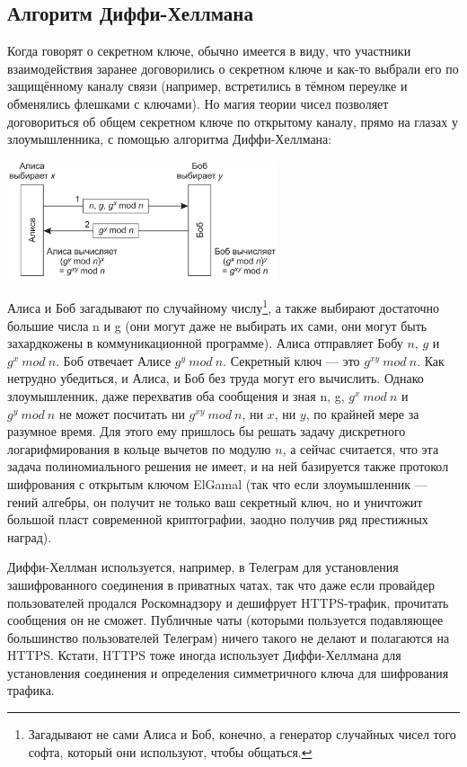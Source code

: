 \documentclass{../mcstext}
\begin{document}
\subsection{Алгоритм Диффи-Хеллмана}

Когда говорят о секретном ключе, обычно имеется в виду, что участники взаимодействия заранее договорились о секретном ключе и как-то выбрали его по защищённому каналу связи (например, встретились в тёмном переулке и обменялись флешками с ключами). Но магия теории чисел позволяет договориться об общем секретном ключе по открытому каналу, прямо на глазах у злоумышленника, с помощью алгоритма Диффи-Хеллмана:

\begin{center}
    \includegraphics[width=0.6\textwidth]{diffieHellman.png}
\end{center}

Алиса и Боб загадывают по случайному числу\footnote{Загадывают не сами Алиса и Боб, конечно, а генератор случайных чисел того софта, который они используют, чтобы общаться.}, а также выбирают достаточно большие числа n и g (они могут даже не выбирать их сами, они могут быть захардкожены в коммуникационной программе). Алиса отправляет Бобу $n$, $g$ и $g^x\ mod\ n$. Боб отвечает Алисе $g^y\ mod\ n$. Секретный ключ --- это $g^{xy}\ mod\ n$. Как нетрудно убедиться, и Алиса, и Боб без труда могут его вычислить. Однако злоумышленник, даже перехватив оба сообщения и зная n, g, $g^x\ mod\ n$ и $g^y\ mod\ n$ не может посчитать ни $g^{xy}\ mod\ n$, ни $x$, ни $y$, по крайней мере за разумное время. Для этого ему пришлось бы решать задачу дискретного логарифмирования в кольце вычетов по модулю $n$, а сейчас считается, что эта задача полиномиального решения не имеет, и на ней базируется также протокол шифрования с открытым ключом ElGamal (так что если злоумышленник --- гений алгебры, он получит не только ваш секретный ключ, но и уничтожит большой пласт современной криптографии, заодно получив ряд престижных наград).

Диффи-Хеллман используется, например, в Телеграм для установления зашифрованного соединения в приватных чатах, так что даже если провайдер пользователей продался Роскомнадзору и дешифрует HTTPS-трафик, прочитать сообщения он не сможет. Публичные чаты (которыми пользуется подавляющее большинство пользователей Телеграм) ничего такого не делают и полагаются на HTTPS. Кстати, HTTPS тоже иногда использует Диффи-Хеллмана для установления соединения и определения симметричного ключа для шифрования трафика.
\end{document}
